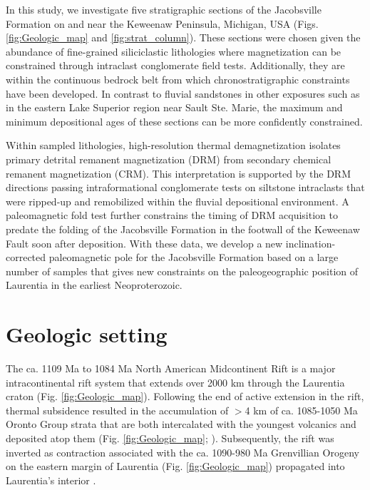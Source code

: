 In this study, we investigate five stratigraphic sections of the Jacobsville Formation on and near the Keweenaw Peninsula, Michigan, USA (Figs. \ref{fig:Geologic_map} and \ref{fig:strat_column}). These sections were chosen given the abundance of fine-grained siliciclastic lithologies where magnetization can be constrained through intraclast conglomerate field tests. Additionally, they are within the continuous bedrock belt from which chronostratigraphic constraints have been developed. In contrast to fluvial sandstones in other exposures such as in the eastern Lake Superior region near Sault Ste. Marie, the maximum and minimum depositional ages of these sections can be more confidently constrained. 

Within sampled lithologies, high-resolution thermal demagnetization isolates primary detrital remanent magnetization (DRM) from secondary chemical remanent magnetization (CRM). This interpretation is supported by the DRM directions passing intraformational conglomerate tests on siltstone intraclasts that were ripped-up and remobilized within the fluvial depositional environment. A paleomagnetic fold test further constrains the timing of DRM acquisition to predate the folding of the Jacobsville Formation in the footwall of the Keweenaw Fault soon after deposition. With these data, we develop a new inclination-corrected paleomagnetic pole for the Jacobsville Formation based on a large number of samples that gives new constraints on the paleogeographic position of Laurentia in the earliest Neoproterozoic.

\section*{Geologic setting}

The ca. 1109 Ma to 1084 Ma North American Midcontinent Rift is a major intracontinental rift system that extends over 2000 km through the Laurentia craton (Fig. \ref{fig:Geologic_map}). Following the end of active extension in the rift, thermal subsidence resulted in the accumulation of $>$4 km of ca. 1085-1050 Ma Oronto Group strata that are both intercalated with the youngest volcanics and deposited atop them (Fig. \ref{fig:Geologic_map}; ). Subsequently, the rift was inverted as contraction associated with the ca. 1090-980 Ma Grenvillian Orogeny on the eastern margin of Laurentia (Fig. \ref{fig:Geologic_map}) propagated into Laurentia's interior \cite{Cannon1993a, Cannon1994a, Hodgin2022a, Swanson-Hysell2023a}. 

